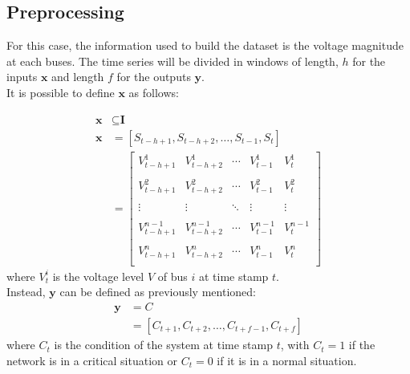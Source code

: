 \subsection{Preprocessing}
For this case, the information used to build the dataset is the voltage magnitude at each buses. The time series will be divided in windows of length, $h$ for the inputs $\textbf{x}$ and length $f$ for the outputs $\textbf{y}$. \\

It is possible to define $\textbf{x}$ as follows:

\begin{equation}
  \begin{aligned}
    \textbf{x} & \subseteq \textbf{I} \\
    \textbf{x} & = [S_{t-h+1},S_{t-h+2},\dots,S_{t-1},S_{t}]\\
        & = 
        \begin{bmatrix}
        V^1_{t-h+1} & V^1_{t-h+2} & \cdots & V^1_{t-1} & V^1_{t} \\
        & & & & \\
        
        V^2_{t-h+1} & V^2_{t-h+2} & \cdots & V^2_{t-1} & V^2_{t} \\
        & & & & \\
        
        \vdots & \vdots & \ddots & \vdots & \vdots \\
        & & & & \\
        
        V^{n-1}_{t-h+1} & V^{n-1}_{t-h+2} & \cdots & V^{n-1}_{t-1} & V^{n-1}_{t} \\
        & & & & \\
        
        V^n_{t-h+1} & V^n_{t-h+2} & \cdots & V^n_{t-1} & V^n_{t} \\
        \end{bmatrix}
  \end{aligned}
\end{equation}
\noindent where $V^i_t$ is the voltage level $V$ of bus $i$ at time stamp $t$. \\

\noindent Instead, $\textbf{y}$ can be defined as previously mentioned: 
\begin{equation}
    \begin{aligned}
        \textbf{y} & = C \\
    & = [C_{t+1},C_{t+2}, \dots, C_{t+f-1},C_{t+f}]
    \end{aligned}
\end{equation}
\noindent where $C_t$ is the condition of the system at time stamp $t$, with $C_t=1$ if the network is in a critical situation or $C_t=0$ if it is in a normal situation. \\

